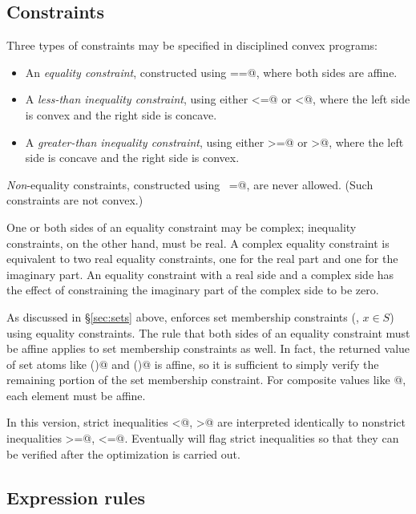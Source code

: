 \documentclass[12pt]{article}
\begin{document}
\subsection{Constraints}

Three types of constraints may be specified in disciplined convex programs:
\begin{itemize}
\item An \emph{equality constraint}, constructed using \verb@==@,
where both sides are affine.
\item A \emph{less-than inequality constraint}, using either
\verb@<=@ or \verb@<@,
where the left side is convex and the right side is concave.
\item A \emph{greater-than inequality constraint}, using either
\verb@>=@ or \verb@>@,
where the left side is concave and the right side is convex.
\end{itemize}
\emph{Non}-equality constraints, constructed using
\verb@~=@, are never allowed.   (Such constraints are not convex.)

One or both sides of an equality constraint may be complex; inequality constraints,
on the other hand, must be real. A complex equality
constraint is equivalent to two real equality constraints, one for the real part
and one for the imaginary part. 
An equality constraint with
a real side and a complex side has the effect of constraining the 
imaginary part of the complex side to be zero.

As discussed in \S\ref{sec:sets} above, \cvx enforces set 
membership constraints (\eg, $x\in S$) using
equality constraints. 
The rule that both sides of an equality constraint
must be affine  applies to set membership constraints as well. 
In fact, the returned value of set atoms like 
\verb@semidefinite()@ and \verb@lorentz()@ is affine,
so it is sufficient to simply verify the remaining portion
of the set membership constraint. For composite values like
@, each element must be affine.

In this version, 
strict inequalities \verb@<@, \verb@>@ are interpreted
identically to nonstrict inequalities \verb@>=@, \verb@<=@. 
Eventually \cvx will flag strict inequalities so that they 
can be verified after the optimization is carried out.

\subsection{Expression rules}
\label{sec:noproduct}
\end{document}

